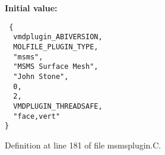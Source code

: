 {\bf Initial value:}

\footnotesize\begin{verbatim} {
  vmdplugin_ABIVERSION,               
  MOLFILE_PLUGIN_TYPE,                
  "msms",                             
  "MSMS Surface Mesh",                
  "John Stone",                       
  0,                                  
  2,                                  
  VMDPLUGIN_THREADSAFE,               
  "face,vert"                         
}\end{verbatim}\normalsize 


Definition at line 181 of file msmsplugin.C.